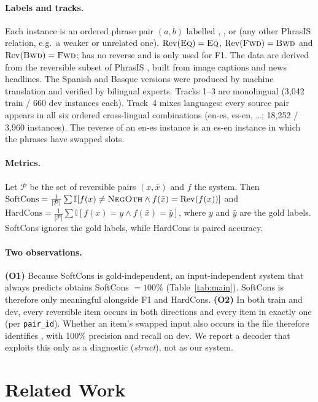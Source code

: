 \paragraph{Labels and tracks.} Each instance is an ordered phrase pair $(a,b)$ labelled \EQ, \FE, \BE or \NO (any other PhrasIS relation, e.g.\ a weaker or unrelated one). $\mathrm{Rev}(\textsc{Eq})=\textsc{Eq}$, $\mathrm{Rev}(\textsc{Fwd})=\textsc{Bwd}$ and $\mathrm{Rev}(\textsc{Bwd})=\textsc{Fwd}$; \NO has no reverse and is only used for F1. The data are derived from the reversible subset of PhrasIS \citep{lopezgazpio2024phrasis}, built from image captions and news headlines. The Spanish and Basque versions were produced by machine translation and verified by bilingual experts. Tracks 1--3 are monolingual (3{,}042 train / 660 dev instances each). Track~4 mixes languages: every source pair appears in all six ordered cross-lingual combinations (en-es, es-en, \dots; 18{,}252 / 3{,}960 instances). The reverse of an en-es instance is an es-en instance in which the phrases have swapped slots.

\paragraph{Metrics.} Let $\mathcal{P}$ be the set of reversible pairs $(x, \bar{x})$ and $f$ the system. Then
$\text{SoftCons} = \frac{1}{|\mathcal{P}|}\sum \mathbb{I}[f(x)\neq\textsc{NegOth} \wedge f(\bar{x})=\mathrm{Rev}(f(x))]$ and
$\text{HardCons} = \frac{1}{|\mathcal{P}|}\sum \mathbb{I}[f(x)=y \wedge f(\bar{x})=\bar{y}]$, where $y$ and $\bar{y}$ are the gold labels.
SoftCons ignores the gold labels, while HardCons is paired accuracy.

\paragraph{Two observations.} \textbf{(O1)} Because SoftCons is gold-independent, an input-independent system that always predicts \EQ obtains SoftCons $=100\%$ (Table~\ref{tab:main}). SoftCons is therefore only meaningful alongside F1 and HardCons.
\textbf{(O2)} In both train and dev, every reversible item occurs in both directions and every \NO item in exactly one (per \texttt{pair\_id}). Whether an item's swapped input also occurs in the file therefore identifies \NO, with 100\% precision and recall on dev. We report a decoder that exploits this only as a diagnostic (\textit{struct}), not as our system.

\section{Related Work}

